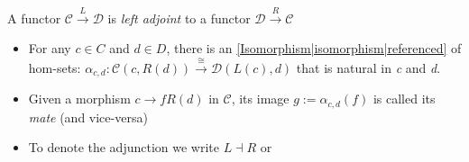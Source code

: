 
A functor $\mathcal{C}\xrightarrow{L}\mathcal{D}$ is \emph{left adjoint} to a functor  $\mathcal{D}\xrightarrow{R}\mathcal{C}$

\begin{itemize}
    \item  For any $c \in C$ and $d \in D$, there is an \ref{Isomorphism|isomorphism|referenced} of hom-sets: $\alpha_{c,d}: \mathcal{C}(c,R(d)) \xrightarrow{\cong} \mathcal{D}(L(c),d)$ that is natural in \emph{c} and \emph{d}.
    \item Given a morphism $c \rightarrow{f} R(d)$ in $\mathcal{C}$, its image $g:=\alpha_{c,d}(f)$ is called its \emph{mate} (and vice-versa)
    \item To denote the adjunction we write $L \dashv R$ or 

  \end{itemize}
